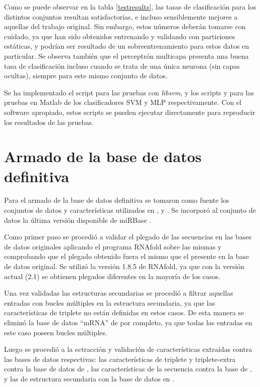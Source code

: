 \documentclass[12pt,bibliography=oldstyle,DIV=12,parskip=half-,titlepage]{scrartcl}
\begin{document}
Como se puede observar en la tabla \ref{testresults}, las tasas de
clasificación para los distintos conjuntos resultan satisfactorias, e
incluso sensiblemente mejores a aquellas del trabajo original.  Sin
embargo, estos números deberán tomarse con cuidado, ya que han sido
obtenidos entrenando y validando con particiones estáticas, y podrían
ser resultado de un sobreentrenamiento para estos datos en
particular. Se observa también que el perceptrón multicapa presenta
una buena tasa de clasificación incluso cuando se trata de una única
neurona (sin capas ocultas), siempre para este mismo conjunto de
datos.

Se ha implementado el script  para las
pruebas con \emph{libsvm}, y los scripts  y
 para las pruebas en Matlab de los clasificadores
SVM y MLP respectivamente. Con el software apropiado, estos scripts
se pueden ejecutar directamente para reproducir los resultados de las
pruebas.
%
%
%
%
%
\section{Armado de la base de datos definitiva}
Para el armado de la base de datos definitiva se tomaron como fuente
los conjuntos de datos y características utilizados en \cite{xue},
\cite{ng} y \cite{batuwita}. Se incorporó al conjunto de datos
la última versión disponible de miRBase \cite{mirbase}.

Como primer paso se procedió a validar el plegado de las secuencias en
las bases de datos originales aplicando el programa RNAfold sobre las
mismas y comprobando que el plegado obtenido fuera el mismo que el
presente en la base de datos original. Se utilizó la versión 1.8.5 de
RNAfold, ya que con la versión actual (2.1) se obtienen plegados
diferentes en la mayoría de los casos.

Una vez validadas las estructuras secundarias se procedió a filtrar
aquellas entradas con bucles múltiples en la estructura secundaria, ya
que las características de triplete no están definidas en estos casos.
De esta manera se eliminó la base de datos ``mRNA'' de \cite{ng} por
completo, ya que todas las entradas en este caso poseen bucles
múltiples.

Luego se procedió a la ectracción y validación de características
extraídas contra las bases de datos respectivas: las características
de triplete y triplete-extra contra la base de datos de \cite{xue},
las características de la secuencia contra la base de \cite{ng}, y las
de estructura secundaria con la base de datos en \cite{batuwita}.
\end{document}
